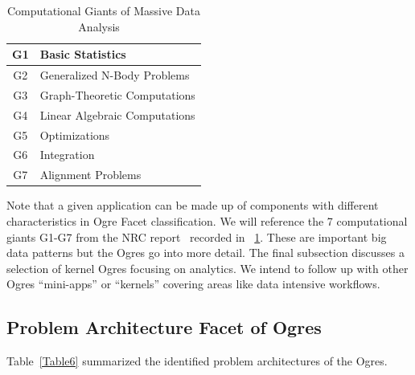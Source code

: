 \documentclass{acm_proc_article-sp}
\begin{document}
\begin{table}[h]
\centering
\caption{ Computational Giants of Massive Data Analysis ~\cite{b13}}
\label{Table5}
\begin{tabular}{|c|p{5cm}|} \hline
G1 & Basic Statistics \\ \hline
G2 & Generalized N-Body Problems \\ \hline
G3 & Graph-Theoretic Computations \\ \hline 
G4 & Linear Algebraic Computations \\ \hline
G5 & Optimizations \\ \hline
G6 & Integration \\ \hline
G7 & Alignment Problems 
\\ \hline
\end{tabular}
\end{table}

Note that a given application can be made up of components with different
characteristics in Ogre Facet classification. We will reference the 7
computational giants G1-G7 from the NRC report~\cite{b13} recorded in
~\ref{Table5}. These are important big data patterns but the Ogres go into more
detail. The final subsection discusses a selection of kernel Ogres focusing on
analytics. We intend to follow up with other Ogres ``mini-apps'' or ``kernels''
covering areas like data intensive workflows.


\subsection{Problem Architecture Facet of Ogres}

Table~\ref{Table6} summarized the identified problem architectures of the Ogres.
\end{document}
